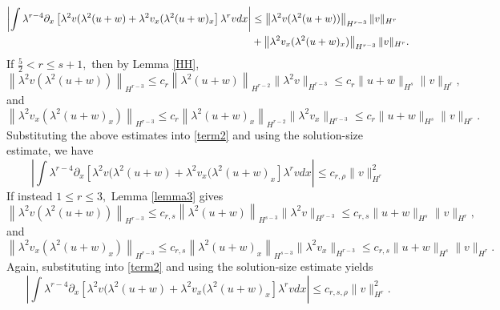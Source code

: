 \documentclass[reqno]{amsart}
\theoremstyle{plain}
\numberwithin{equation}{section}
\begin{document}
\begin{align}
 \notag   \left|\int \lambda^{r-4}\partial_x\left[\lambda^2v(\lambda^2(u+w) + \lambda^2v_x(\lambda^2(u+w)_x\right]\lambda^{r}vdx\right| 
        & \leq \left\|\lambda^2v(\lambda^2(u+w))\right\|_{H^{r-3}}\|v\|_{H^r} 
        \\ &+ \left\|\lambda^2v_x(\lambda^2(u+w)_x)\right\|_{H^{r-3}}\|v\|_{H^r}. \label{term2}
\end{align} 
If $\frac52 < r \leq s + 1,$ then by Lemma \ref{HH}, 
\begin{equation*} 
        \left\|\lambda^2v(\lambda^2(u+w))\right\|_{H^{r-3}} 
            \leq c_{r}\left\|\lambda^2(u+w)\right\|_{H^{r-2}}\|\lambda^2v\|_{H^{r-3}} 
                \leq c_r\|u+w\|_{H^s}\|v\|_{H^r},
\end{equation*}
and 
\begin{equation*} 
        \left\|\lambda^2v_x(\lambda^2(u+w)_x)\right\|_{H^{r-3}} 
            \leq c_{r}\left\|\lambda^2(u+w)_x\right\|_{H^{r-2}}\|\lambda^2v_x\|_{H^{r-3}} 
                \leq c_r\|u+w\|_{H^s}\|v\|_{H^r}.
\end{equation*}
Substituting the above estimates into \eqref{term2} and using the solution-size estimate, we have 
\begin{equation}\label{term2lem2est}
    \left|\int \lambda^{r-4}\partial_x\left[\lambda^2v(\lambda^2(u+w) + \lambda^2v_x(\lambda^2(u+w)_x\right]\lambda^{r}vdx\right| 
         \leq  c_{r,\rho}\|v\|_{H^r}^2
\end{equation}
If instead $1 \leq r \leq 3,$ Lemma \ref{lemma3} gives 
\begin{equation*} 
        \left\|\lambda^2v(\lambda^2(u+w))\right\|_{H^{r-3}} 
            \leq c_{r,s}\left\|\lambda^2(u+w)\right\|_{H^{s-3}}\|\lambda^2v\|_{H^{r-3}} 
                \leq c_{r,s}\|u+w\|_{H^s}\|v\|_{H^r},
\end{equation*}
and 
\begin{equation*} 
        \left\|\lambda^2v_x(\lambda^2(u+w)_x)\right\|_{H^{r-3}} 
            \leq c_{r,s}\left\|\lambda^2(u+w)_x\right\|_{H^{s-3}}\|\lambda^2v_x\|_{H^{r-3}} 
                \leq c_{r,s}\|u+w\|_{H^s}\|v\|_{H^r}.
\end{equation*}
Again, substituting into \eqref{term2} and using the solution-size estimate yields 
\begin{equation}\label{term2lem3est}
    \left|\int \lambda^{r-4}\partial_x\left[\lambda^2v(\lambda^2(u+w) + \lambda^2v_x(\lambda^2(u+w)_x\right]\lambda^{r}vdx\right| 
         \leq  c_{r,s,\rho}\|v\|_{H^r}^2.
\end{equation}
\end{document}
